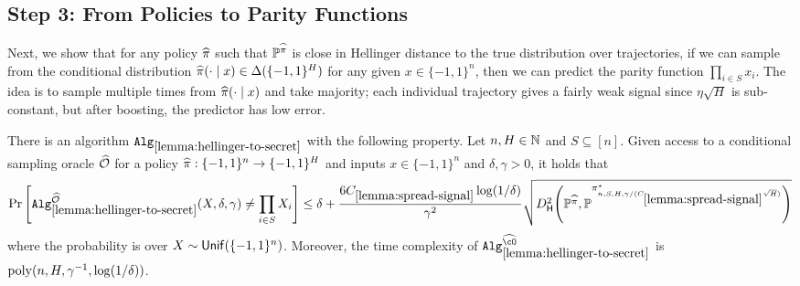\subsection{Step 3: From Policies to Parity Functions}\label{subsec:policy-to-parity}

Next, we show that for any policy $\widehat{\pi}$ such that $\mathbb{P}^{\widehat{\pi}}$ is close in Hellinger distance to the true distribution over trajectories, if we can sample from the conditional distribution $\widehat{\pi}(\cdot\mid{}x) \in \Delta(\{-1,1\}^H)$ for any given $x \in \{-1,1\}^n$, then we can predict the parity function $\prod_{i \in S} x_i$. The idea is to sample multiple times from $\widehat{\pi}(\cdot\mid{}x)$ and take majority; each individual trajectory gives a fairly weak signal since $\eta \sqrt{H}$ is sub-constant, but after boosting, the predictor has low error.


\begin{lemma}\label{lemma:hellinger-to-secret}
There is an algorithm $\texttt{Alg}_{\ref{lemma:hellinger-to-secret}}$ with the following property. Let $n, H \in \mathbb{N}$ and $S \subseteq [n]$. Given access to a conditional sampling oracle $\widehat{\mathcal{O}}$ for a policy $\widehat{\pi}: \{-1,1\}^n \to \{-1,1\}^H$ and inputs $x \in \{-1,1\}^n$ and $\delta,\gamma>0$, it holds that
\[\Prr\left[\Alg_{\ref{lemma:hellinger-to-secret}}^{\wh\MO}(X,\delta,\gamma) \neq \prod_{i \in S} X_i\right] \leq \delta + \frac{6C_{\ref{lemma:spread-signal}}\log(1/\delta)}{\gamma^2} \sqrt{\Dhels{\BP^{\pihat}}{\BP^{\pi^\st_{n,S,H,\gamma/(C_{\ref{lemma:spread-signal}}\sqrt{H})}}}}\]
where the probability is over $X \sim \mathsf{Unif}(\{-1,1\}^n)$. Moreover, the time complexity of $\Alg^{\wh{\cO}}_{\ref{lemma:hellinger-to-secret}}$ is $\mathrm{poly}(n,H,\gamma^{-1},\log(1/\delta))$.
\end{lemma}

